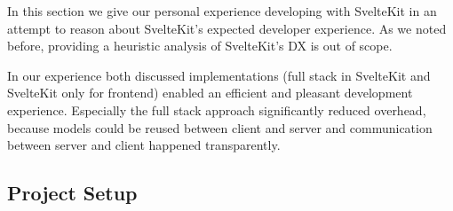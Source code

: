
In this section we give our personal experience developing with SvelteKit in an attempt to reason about SvelteKit's expected developer experience. As we noted before, providing a heuristic analysis of SvelteKit's DX is out of scope.

In our experience both discussed implementations (full stack in SvelteKit and SvelteKit only for frontend) enabled an efficient and pleasant development experience. Especially the full stack approach significantly reduced overhead, because models could be reused between client and server and communication between server and client happened transparently.



\subsection{Project Setup}






